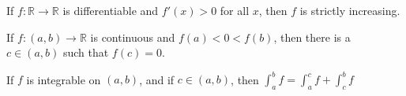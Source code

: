 \documentclass[crop=false,class=book,oneside]{standalone}
\begin{document}
    \begin{theorem*}
        If $f:\mathbb{R}\rightarrow \mathbb{R}$
        is differentiable
        and $f'(x)>0$ for all $x$,
        then $f$ is strictly increasing.
    \end{theorem*}
    \begin{theorem*}
        If $f:(a,b)\rightarrow\mathbb{R}$ is continuous and
        $f(a)<0<f(b)$, then there is a $c\in (a,b)$ such that
        $f(c)=0$.
    \end{theorem*}
    \begin{theorem*}
        If $f$ is integrable on $(a,b)$, and if $c\in(a,b)$, then
        $\int_{a}^{b}f=\int_{a}^{c}f+\int_{c}^{b}f$
    \end{theorem*}
\end{document}
